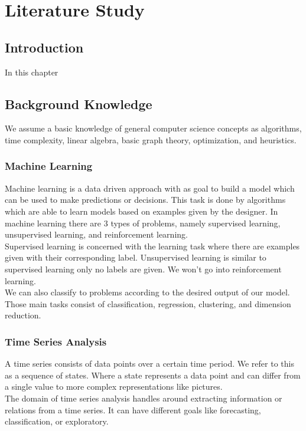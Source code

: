 \graphicspath{ {LiteratureStudyImages/} }

\chapter{Literature Study}
\label{cha:literatureStudy}

\section{Introduction}
In this chapter 


\section{Background Knowledge}
We assume a basic knowledge of general computer science concepts as algorithms, time complexity, linear algebra, basic graph theory, optimization, and heuristics.


	\subsection{Machine Learning}
Machine learning is a data driven approach with as goal to build a model which can be	used to make predictions or decisions. This task is done by algorithms which are able to learn models based on examples given by the designer. In machine learning there are $3$ types of problems, namely supervised learning, unsupervised learning, and reinforcement learning. \\
Supervised learning is concerned with the learning task where there are examples given with their corresponding label. Unsupervised learning is similar to supervised learning only no labels are given. We won't go into reinforcement learning. \\
We can also classify to problems according to the desired output of our model. Those main tasks consist of classification, regression, clustering, and dimension reduction.
	
	
	\subsection{Time Series Analysis}
A time series consists of data points over a certain time period. We refer to this as a sequence of states. Where a state represents a data point and can differ from a single value to more complex representations like pictures. \\
The domain of time series analysis handles around extracting information or relations from a time series. It can have different goals like forecasting, classification, or exploratory.
	
